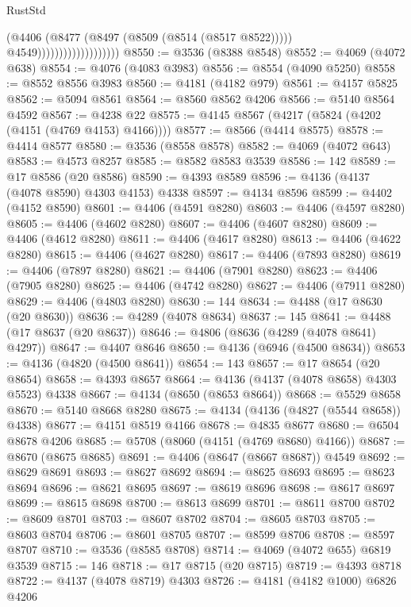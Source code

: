 \begin{lexlean}{RustStd}
\begin{coremodule}
{\begin{coremodule}
{{{{{{{{{{{{{{{{{{{{{{{{{{{{{{{{{{{{{{{{{{{{{{{{{{                                        (@4406
                                          (@8477 (@8497 (@8509 (@8514 (@8517 @8522)))))
                                          @4549)))))))))))))))))))
@8550 := @3536 (@8388 @8548)
@8552 := @4069 (@4072 @638)
@8554 := @4076 (@4083 @3983)
@8556 := @8554 (@4090 @5250)
@8558 := @8552 @8556 @3983
@8560 := @4181 (@4182 @979)
@8561 := @4157 @5825
@8562 := @5094 @8561
@8564 := @8560 @8562 @4206
@8566 := @5140 @8564 @4592
@8567 := @4238 @22
@8575 := @4145 @8567 (@4217 (@5824 (@4202 (@4151 (@4769 @4153) @4166))))
@8577 := @8566 (@4414 @8575)
@8578 := @4414 @8577
@8580 := @3536 (@8558 @8578)
@8582 := @4069 (@4072 @643)
@8583 := @4573 @8257
@8585 := @8582 @8583 @3539
@8586 := 142
@8589 := @17 @8586 (@20 @8586)
@8590 := @4393 @8589
@8596 := @4136 (@4137 (@4078 @8590) @4303 @4153) @4338
@8597 := @4134 @8596
@8599 := @4402 (@4152 @8590)
@8601 := @4406 (@4591 @8280)
@8603 := @4406 (@4597 @8280)
@8605 := @4406 (@4602 @8280)
@8607 := @4406 (@4607 @8280)
@8609 := @4406 (@4612 @8280)
@8611 := @4406 (@4617 @8280)
@8613 := @4406 (@4622 @8280)
@8615 := @4406 (@4627 @8280)
@8617 := @4406 (@7893 @8280)
@8619 := @4406 (@7897 @8280)
@8621 := @4406 (@7901 @8280)
@8623 := @4406 (@7905 @8280)
@8625 := @4406 (@4742 @8280)
@8627 := @4406 (@7911 @8280)
@8629 := @4406 (@4803 @8280)
@8630 := 144
@8634 := @4488 (@17 @8630 (@20 @8630))
@8636 := @4289 (@4078 @8634)
@8637 := 145
@8641 := @4488 (@17 @8637 (@20 @8637))
@8646 := @4806 (@8636 (@4289 (@4078 @8641) @4297))
@8647 := @4407 @8646
@8650 := @4136 (@6946 (@4500 @8634))
@8653 := @4136 (@4820 (@4500 @8641))
@8654 := 143
@8657 := @17 @8654 (@20 @8654)
@8658 := @4393 @8657
@8664 := @4136 (@4137 (@4078 @8658) @4303 @5523) @4338
@8667 := @4134 (@8650 (@8653 @8664))
@8668 := @5529 @8658
@8670 := @5140 @8668 @8280
@8675 := @4134 (@4136 (@4827 (@5544 @8658)) @4338)
@8677 := @4151 @8519 @4166
@8678 := @4835 @8677
@8680 := @6504 @8678 @4206
@8685 := @5708 (@8060 (@4151 (@4769 @8680) @4166))
@8687 := @8670 (@8675 @8685)
@8691 := @4406 (@8647 (@8667 @8687)) @4549
@8692 := @8629 @8691
@8693 := @8627 @8692
@8694 := @8625 @8693
@8695 := @8623 @8694
@8696 := @8621 @8695
@8697 := @8619 @8696
@8698 := @8617 @8697
@8699 := @8615 @8698
@8700 := @8613 @8699
@8701 := @8611 @8700
@8702 := @8609 @8701
@8703 := @8607 @8702
@8704 := @8605 @8703
@8705 := @8603 @8704
@8706 := @8601 @8705
@8707 := @8599 @8706
@8708 := @8597 @8707
@8710 := @3536 (@8585 @8708)
@8714 := @4069 (@4072 @655) @6819 @3539
@8715 := 146
@8718 := @17 @8715 (@20 @8715)
@8719 := @4393 @8718
@8722 := @4137 (@4078 @8719) @4303
@8726 := @4181 (@4182 @1000) @6826 @4206
}}}}}}}}}}}}}}}}}}}}}}}}}}}}}}}}}}}}}}}}}}}}}}}}}}
\end{coremodule}}
\end{coremodule}
\end{lexlean}
